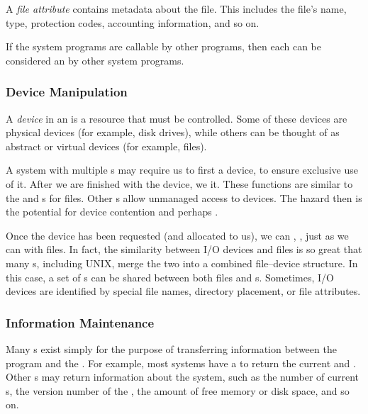 \begin{definition}\label{def:File_Attribute}
  A \emph{file attribute} contains metadata about the file.
  This includes the file's name, type, protection codes, accounting information, and so on.
\end{definition}

\begin{remark*}
  If the system programs are callable by other programs, then each can be considered an  by other system programs.
\end{remark*}

\subsubsection{Device Manipulation}\label{subsubsec:Device_Manipulation}
\begin{definition}[Device]\label{def:Device}
  A \emph{device} in an  is a resource that must be controlled.
  Some of these devices are physical devices (for example, disk drives), while others can be thought of as abstract or virtual devices (for example, files).
\end{definition}

A system with multiple s may require us to first  a device, to ensure exclusive use of it.
After we are finished with the device, we  it.
These functions are similar to the  and  s for files.
Other s allow unmanaged access to devices.
The hazard then is the potential for device contention and perhaps .

Once the device has been requested (and allocated to us), we can , , just as we can with files.
In fact, the similarity between I/O devices and files is so great that many s, including UNIX, merge the two into a combined file–device structure.
In this case, a set of s can be shared between both files and s.
Sometimes, I/O devices are identified by special file names, directory placement, or file attributes.

\subsubsection{Information Maintenance}\label{subsubsec:Information_Maintenance}
Many s exist simply for the purpose of transferring information between the  program and the .
For example, most systems have a  to return the current  and .
Other s may return information about the system, such as the number of current s, the version number of the , the amount of free memory or disk space, and so on.


